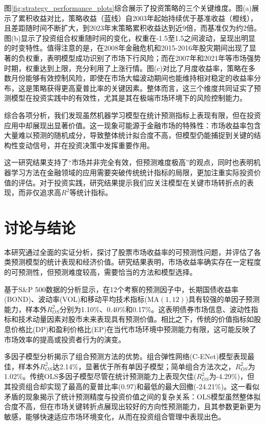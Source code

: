 \documentclass[12pt, a4paper]{article}
\begin{document}
图\ref{fig:strategy_performance_plots}综合展示了投资策略的三个关键维度。图(a)展示了累积收益对比，策略收益（蓝线）自2003年起始持续优于基准收益（橙线），且差距随时间不断扩大，到2023年末策略累积收益达到近9倍，而基准仅为约2倍。图(b)显示了投资组合权重随时间的变化，权重在-1.5至1.5之间波动，呈现出明显的时变特性。值得注意的是，在2008年金融危机和2015-2016年股灾期间出现了显著的负权重，表明模型成功识别了市场下行风险；而在2007年和2021年等市场强势时期，权重达到上限，充分利用了上涨行情。图(c)对比了月度收益率，策略在多数月份能够有效控制风险，即使在市场大幅波动期间也能维持相对稳定的收益率分布，这是策略获得更高夏普比率的关键因素。整体而言，这三个维度共同证实了预测模型在投资实践中的有效性，尤其是其在极端市场环境下的风险控制能力。

综合各项分析，我们发现虽然机器学习模型在统计预测指标上表现有限，但在投资应用中却展现出显著价值。这一现象可能源于金融市场的特殊性：市场收益率包含大量难以预测的随机成分，导致整体统计拟合度不高，但模型仍能捕捉到关键的结构性变动信号，并在投资决策中发挥重要作用。

这一研究结果支持了“市场并非完全有效，但预测难度极高”的观点，同时也表明机器学习方法在金融领域的应用需要突破传统统计指标的局限，更加注重实际投资价值的评估。对于投资实践，研究结果提示我们应关注模型在关键市场转折点的表现，而非仅追求高$R^2$等统计指标。

\section{讨论与结论}

本研究通过全面的实证分析，探讨了股票市场收益率的可预测性问题，并评估了各类预测模型的统计表现和经济价值。研究结果表明，市场收益率确实存在一定程度的可预测性，但预测难度较高，需要恰当的方法和模型选择。

基于S\&P 500数据的分析显示，在12个考察的预测因子中，长期国债收益率(BOND)、波动率(VOL)和移动平均技术指标(MA$(1,12)$)具有较强的单因子预测能力，样本外$R^2_{OS}$分别为1.10\%、0.40\%和0.17\%。这表明债券市场信息、波动性指标和技术动量因素对股市未来表现具有预测价值。相比之下，传统的价值指标如股息价格比(DP)和盈利价格比(EP)在当代市场环境中预测能力有限，这可能反映了市场效率的提高或投资者行为的演变。

多因子模型分析揭示了组合预测方法的优势。组合弹性网络(C-ENet)模型表现最佳，样本外$R^2_{OS}$达2.14\%，显著优于所有单因子模型；简单组合方法次之，$R^2_{OS}$为1.02\%。传统OLS多因子模型尽管在统计预测能力上表现欠佳($R^2_{OS}$为-4.29\%)，但其投资组合却实现了最高的夏普比率(0.97)和最低的最大回撤(-24.21\%)。这一看似矛盾的现象揭示了统计预测精度与投资价值之间的复杂关系：OLS模型虽然整体拟合度不高，但在市场关键转折点展现出较好的方向性预测能力，且其参数更新更为敏感，能够快速适应市场环境变化，从而在投资组合管理中表现出色。
\end{document}
